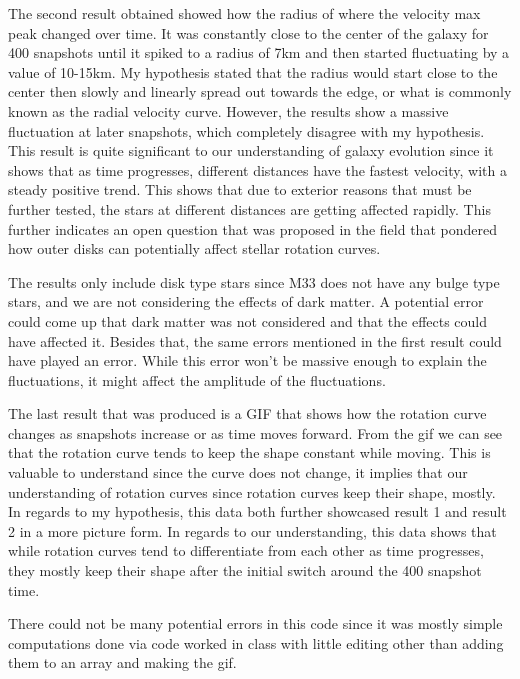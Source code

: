 \documentclass[modern]{aastex61}
\begin{document}
The second result obtained showed how the radius of where the velocity max peak changed over time. It was constantly close to the center of the galaxy for 400 snapshots until it spiked to a radius of 7km and then started fluctuating by a value of 10-15km. My hypothesis stated that the radius would start close to the center then slowly and linearly spread out towards the edge, or what is commonly known as the radial velocity curve. However, the results show a massive fluctuation at later snapshots, which completely disagree with my hypothesis. This result is quite significant to our understanding of galaxy evolution since it shows that as time progresses, different distances have the fastest velocity, with a steady positive trend. This shows that due to exterior reasons that must be further tested, the stars at different distances are getting affected rapidly. This further indicates an open question that was proposed in the field that pondered how outer disks can potentially affect stellar rotation curves.

The results only include disk type stars since M33 does not have any bulge type stars, and we are not considering the effects of dark matter. A potential error could come up that dark matter was not considered and that the effects could have affected it. Besides that, the same errors mentioned in the first result could have played an error. While this error won't be massive enough to explain the fluctuations, it might affect the amplitude of the fluctuations. 

The last result that was produced is a GIF that shows how the rotation curve changes as snapshots increase or as time moves forward. From the gif we can see that the rotation curve tends to keep the shape constant while moving. This is valuable to understand since the curve does not change, it implies that our understanding of rotation curves since rotation curves keep their shape, mostly. In regards to my hypothesis, this data both further showcased result 1 and result 2 in a more picture form. In regards to our understanding, this data shows that while rotation curves tend to differentiate from each other as time progresses, they mostly keep their shape after the initial switch around the 400 snapshot time. 

There could not be many potential errors in this code since it was mostly simple computations done via code worked in class with little editing other than adding them to an array and making the gif.
\end{document}

